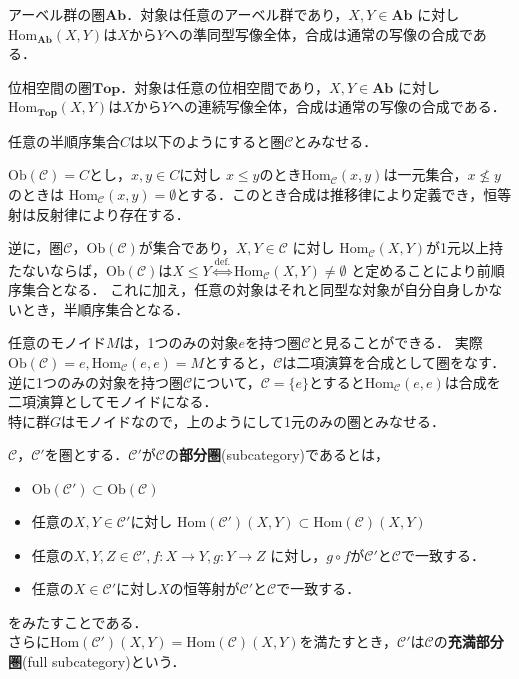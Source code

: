 \begin{ex}
アーベル群の圏$\mathbf{Ab}$．対象は任意のアーベル群であり，$X,Y \in \mathbf{Ab}$ に対し$\mathrm{Hom}_\mathbf{Ab}(X,Y)$は$X$から$Y$への準同型写像全体，合成は通常の写像の合成である．
\end{ex} \proofend

\begin{ex}
位相空間の圏$\mathbf{Top}$．対象は任意の位相空間であり，$X,Y \in \mathbf{Ab}$ に対し$\mathrm{Hom}_\mathbf{Top}(X,Y)$は$X$から$Y$への連続写像全体，合成は通常の写像の合成である．
\end{ex} \proofend

\begin{ex}
任意の半順序集合$C$は以下のようにすると圏$\mathcal{C}$とみなせる．

$\mathrm{Ob}(\mathcal{C}) = C$とし，$x, y \in C$に対し $x \leq y$のとき$\mathrm{Hom}_\mathcal{C}(x,y)$は一元集合，$x \nleq y$のときは
$\mathrm{Hom}_\mathcal{C}(x,y) = \emptyset$とする．このとき合成は推移律により定義でき，恒等射は反射律により存在する．

逆に，圏$\mathcal{C}$，$\mathrm{Ob}(\mathcal{C})$が集合であり，$X,Y \in \mathcal{C}$ に対し $\mathrm{Hom}_\mathcal{C}(X,Y)$が1元以上持たないならば，$\mathrm{Ob}(\mathcal{C})$は$X \leq Y \stackrel{\mathrm{def.}}{\Leftrightarrow} \mathrm{Hom}_\mathcal{C}(X,Y) \neq\emptyset$ と定めることにより前順序集合となる．
これに加え，任意の対象はそれと同型な対象が自分自身しかないとき，半順序集合となる．
\end{ex} \proofend

\begin{ex}
任意のモノイド$M$は，1つのみの対象$e$を持つ圏$\mathcal{C}$と見ることができる．
実際$\mathrm{Ob}(\mathcal{C}) = {e},\mathrm{Hom}_{\mathcal{C}}(e,e) = M$とすると，$\mathcal{C}$は二項演算を合成として圏をなす．逆に1つのみの対象を持つ圏$\mathcal{C}$について，$\mathcal{C} = \{e\}$とすると$\mathrm{Hom}_{\mathcal{C}}(e,e)$は合成を二項演算としてモノイドになる．\\
特に群$G$はモノイドなので，上のようにして1元のみの圏とみなせる．
\end{ex} \proofend

\begin{defi}
$\mathcal{C}，\mathcal{C'}$を圏とする．$\mathcal{C'}が\mathcal{C}$の{\bf 部分圏}(subcategory)であるとは，
\begin{itemize}
\item $\mathrm{Ob}(\mathcal{C'}) \subset \mathrm{Ob}(\mathcal{C})$
\item 任意の$X,Y \in \mathcal{C'}$に対し $ \mathrm{Hom}(\mathcal{C'})(X,Y) \subset \mathrm{Hom}(\mathcal{C})(X,Y)$
\item 任意の$X,Y, Z \in \mathcal{C'}, f:X \to Y , g:Y \to Z$ に対し，$g \circ f$が$\mathcal{C'}$と$\mathcal{C}$で一致する．
\item 任意の$X \in \mathcal{C'}$に対し$X$の恒等射が$\mathcal{C'}$と$\mathcal{C}$で一致する．
\end{itemize}
をみたすことである．\\
さらに$ \mathrm{Hom}(\mathcal{C'})(X,Y) = \mathrm{Hom}(\mathcal{C})(X,Y)$を満たすとき，$\mathcal{C'}$は$\mathcal{C}$の{\bf 充満部分圏}(full subcategory)という．
\end{defi} \proofend

